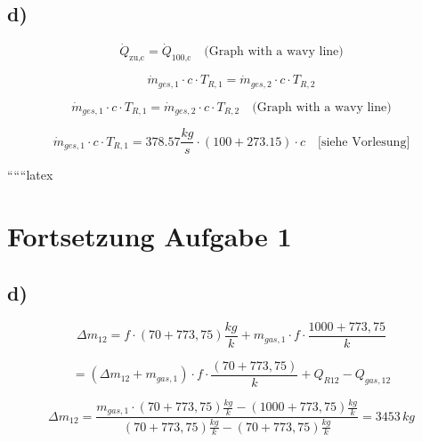 

\subsection*{d)}
\[
\dot{Q}_{\text{zu,c}} = \dot{Q}_{\text{100,c}} \quad \text{(Graph with a wavy line)}
\]

\[
\dot{m}_{ges,1} \cdot c \cdot T_{R,1} = \dot{m}_{ges,2} \cdot c \cdot T_{R,2}
\]

\[
\dot{m}_{ges,1} \cdot c \cdot T_{R,1} = \dot{m}_{ges,2} \cdot c \cdot T_{R,2} \quad \text{(Graph with a wavy line)}
\]

\[
\dot{m}_{ges,1} \cdot c \cdot T_{R,1} = 378.57 \frac{kg}{s} \cdot (100 + 273.15) \cdot c \quad \text{[siehe Vorlesung]}
\]

``````latex


\section*{Fortsetzung Aufgabe 1}



\subsection*{d)}

\[
\Delta m_{12} = f \cdot (70 + 773,75) \frac{kg}{k} + m_{gas,1} \cdot f \cdot \frac{1000 + 773,75}{k}
\]

\[
= (\Delta m_{12} + m_{gas,1}) \cdot f \cdot \frac{(70 + 773,75)}{k} + Q_{R12} - Q_{gas,12}
\]

\[
\Delta m_{12} = \frac{m_{gas,1} \cdot (70 + 773,75) \frac{kg}{k} - (1000 + 773,75) \frac{kg}{k}}{(70 + 773,75) \frac{kg}{k} - (70 + 773,75) \frac{kg}{k}} = \boxed{3453 \, kg}
\]